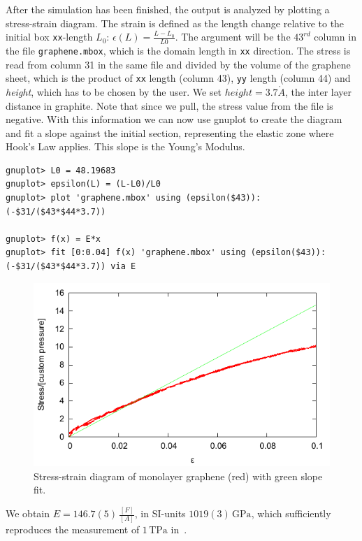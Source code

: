 After the simulation has been finished, the output is analyzed by plotting a
stress-strain diagram. The strain is defined as the length change relative to
the initial box \texttt{xx}-length $L_0$: $\epsilon(L) = \frac{L-L_0}{L0}$.
The argument will be the $43^{rd}$ column in the file \texttt{graphene.mbox}, which
is the domain length in \texttt{xx} direction. The stress is read
from column 31 in the same file and divided by the volume of the graphene sheet, which is the product of
\texttt{xx} length (column 43), \texttt{yy} length (column 44) and
\textit{height}, which has to be chosen by the user. We set $height=3.7 
\mathring{A}$, the inter layer distance in graphite. Note that since we pull,
the stress value from the file is negative. With this information we can now
use gnuplot to create the diagram and fit a slope against the initial
section, representing the elastic zone where Hook's Law applies. This slope is
the Young's Modulus.

\begin{lstlisting}
gnuplot> L0 = 48.19683
gnuplot> epsilon(L) = (L-L0)/L0
gnuplot> plot 'graphene.mbox' using (epsilon($43)):(-$31/($43*$44*3.7))

gnuplot> f(x) = E*x
gnuplot> fit [0:0.04] f(x) 'graphene.mbox' using (epsilon($43)):(-$31/($43*$44*3.7)) via E
\end{lstlisting}

\begin{figure}[h]
    \centering
    \includegraphics{visuals/graphene.pdf}
    \caption{Stress-strain diagram of monolayer graphene (red) with green slope fit.}
\end{figure}

We obtain $E=146.7(5)\,\frac{[F]}{[A]}$, in SI-units $1019(3)\,\textrm{GPa}$, which
sufficiently reproduces the measurement of $1\,\textrm{TPa}$ in~\cite{egraphene}.


